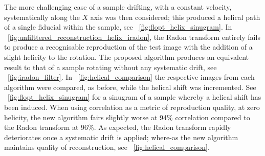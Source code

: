 
The more challenging case of a sample drifting, with a constant velocity, systematically along the \(X\) axis was then considered; this produced a helical path of a single fiducial within the sample, see \figurename~\ref{fig:flopt_helix_sinugram}.
In \figurename~\ref{fig:unfilttered_reconstruction_helix_iradon}, the \gls{Radon transform} entirely fails to produce a recognisable reproduction of the test image with the addition of a slight helicity to the rotation.
The proposed algorithm produces an equivalent result to that of a sample rotating without any systematic drift, see \figurename~\ref{fig:iradon_filter}.
In \figurename~\ref{fig:helical_comparison} the respective images from each algorithm were compared, as before, while the helical shift was incremented.
See \figurename~\ref{fig:flopt_helix_sinugram} for a \gls{sinugram} of a sample whereby a helical shift has been induced.
When using correlation as a metric of reproduction quality, at zero helicity, the new algorithm fairs slightly worse at 94\% correlation compared to the \gls{Radon transform} at 96\%.
As expected, the \gls{Radon transform} rapidly deteriorates once a systematic drift is applied; where-as the new algorithm maintains quality of reconstruction, see \figurename~\ref{fig:helical_comparison}.

